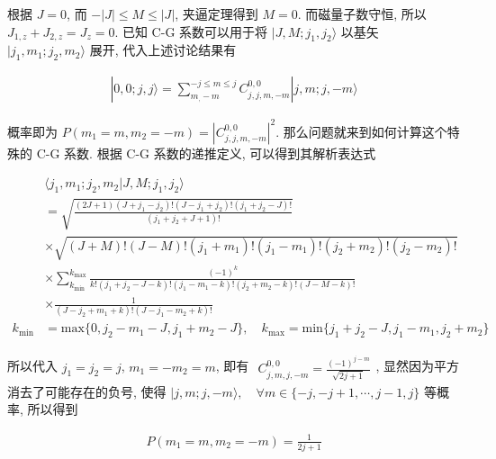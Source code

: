 根据 $J = 0$, 而 $-|J|\leq M\leq |J|$, 夹逼定理得到 $M= 0$. 而磁量子数守恒, 所以 $J_{1,z} + J_{2,z} = J_{z} = 0$. 已知 C-G 系数可以用于将 $|J,M;j_{1},j_{2}\rangle$ 以基矢 $|j_{1},m_{1};j_{2},m_{2}\rangle$ 展开, 代入上述讨论结果有

\begin{align*}
  |0,0;j,j\rangle = \sum_{m_,-m}^{-j\leq m\leq j}C_{j,j,m,-m}^{0,0}|j,m;j,-m\rangle
\end{align*}

概率即为 $P(m_{1}=m,m_{2}=-m) = |C_{j,j,m,-m}^{0,0}|^{2}$. 那么问题就来到如何计算这个特殊的 C-G 系数. 根据 C-G 系数的递推定义, 可以得到其解析表达式

\begin{align*}
  &\langle j_{1},m_{1};j_{2},m_{2}|J,M;j_{1},j_{2}\rangle \\
  &=\sqrt{\frac{(2J+1)(J+j_{1}-j_{2})!(J-j_{1}+j_{2})!(j_{1}+j_{2}-J)!}{(j_{1}+j_{2}+J+1)!}}\\
  &\times \sqrt{(J+M)!(J-M)!(j_{1}+m_{1})!(j_{1}-m_{1})!(j_{2}+m_{2})!(j_{2}-m_{2})!}\\
  &\times \sum_{k_{\text{min}}}^{k_{\text{max}}}\frac{(-1)^{k}}{k!(j_{1}+j_{2}-J-k)!(j_{1}-m_{1}-k)!(j_{2}+m_{2}-k)!(J-M-k)!}\\
  &\times \frac{1}{(J-j_{2}+m_{1}+k)!(J-j_{1}-m_{2}+k)!}\\
  k_{\text{min}} &= \text{max}\{0,j_{2}-m_{1}-J,j_{1}+m_{2}-J\},\quad
  k_{\text{max}} = \text{min}\{j_{1}+j_{2}-J, j_{1}-m_{1},j_{2}+m_{2}\}
\end{align*}

所以代入 $j_{1}=j_{2}=j$, $m_{1}=-m_{2}=m$, 即有 $\begin{aligned}
  C_{j,m,j,-m}^{0,0} = \frac{(-1)^{j-m}}{\sqrt{2j+1}}
\end{aligned}$, 显然因为平方消去了可能存在的负号, 使得 
$|j,m;j,-m\rangle,\quad\forall m\in \{-j,-j+1,\cdots,j-1,j\}$ 等概率, 所以得到

\begin{align*}
  \boxed{P(m_{1}=m,m_{2}=-m) = \frac{1}{2j+1}}
\end{align*}